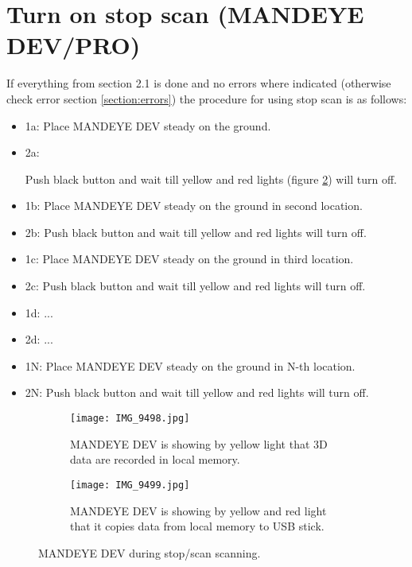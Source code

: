 \pagebreak
\section{Turn on stop scan (MANDEYE DEV/PRO)}
If everything from section 2.1 is done and no errors where indicated (otherwise check error section \ref{section:errors}) the procedure for using stop scan is as follows:
\begin{itemize}
	\item 1a: Place MANDEYE DEV steady on the ground.
	\item 2a: \begin{minipage}[t]{0.75\linewidth}
		\raggedright
		\medskip	
	\end{minipage}
	\linebreak
	Push black button and wait till yellow and red lights (figure \ref{fig:m42}) will turn off.
	\item 1b: Place MANDEYE DEV steady on the ground in second location.
	\item 2b: Push black button and wait till yellow and red lights will turn off.
	\item 1c: Place MANDEYE DEV steady on the ground in third location.
	\item 2c: Push black button and wait till yellow and red lights will turn off.
	\item 1d: ...
	\item 2d: ...
	\item 1N: Place MANDEYE DEV steady on the ground in N-th location.
	\item 2N: Push black button and wait till yellow and red lights will turn off.
\end{itemize}
\begin{figure}[H]
	\centering
	\begin{subfigure}[b]{0.45\textwidth}
		\centering
		\texttt{[image: IMG\_9498.jpg]}
		\caption{MANDEYE DEV is showing by yellow light that 3D data are recorded in local memory.}
		\label{fig:m41}
	\end{subfigure}
	\hfill
	\begin{subfigure}[b]{0.45\textwidth}
		\centering
		\texttt{[image: IMG\_9499.jpg]}
		\caption{MANDEYE DEV is showing by yellow and red light that it copies data from local memory to USB stick.}
		\label{fig:m42}
	\end{subfigure}
	\caption{MANDEYE DEV during stop/scan scanning.}
	\label{fig:mandeye_hardware4}
\end{figure}

